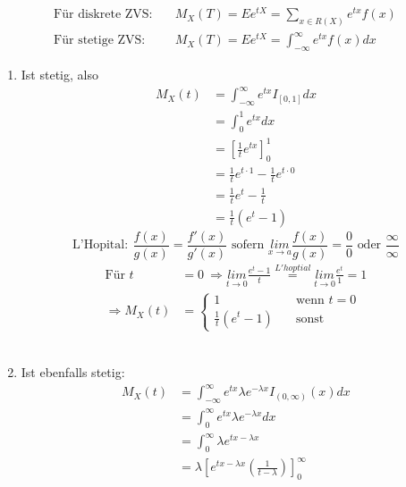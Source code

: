 \documentclass{article}
\begin{document}
\begin{align*}
    \text{Für diskrete ZVS:} \quad & M_X(T) = Ee^{tX} = \sum_{x \in R(X) }e^{tx}f(x) \\
    \text{Für stetige ZVS:} \quad & M_X(T) = Ee^{tX} = \int_{-\infty}^{\infty}e^{tx} f(x) dx
\end{align*}
\begin{enumerate}[label= zu \roman*)]
    \item   Ist stetig, also\begin{align*}
                M_X(t) &=  \int_{-\infty}^{\infty} e^{tx}I_{[0,1]} dx\\
                &= \int_{0}^{1} e^{tx} dx \\
                &= \left[\frac{1}{t} e^{tx}\right]_0^1 \\
                &= \frac{1}{t} e^{t\cdot 1} - \frac{1}{t} e^{t\cdot 0} \\  
                &= \frac{1}{t} e^t - \frac{1}{t} \\
                &= \frac{1}{t}(e^t -1)
            \end{align*} 
            \[\text{L'Hopital}: ~ \frac{f(x)}{g(x)} = \frac{f'(x)}{g'(x)} \text{ sofern } \underset{x \rightarrow a}{lim} \frac{f(x)}{g(x)} = \frac{0}{0} \text{ oder } \frac{\infty}{\infty}\]
            \begin{align*} 
                \text{Für } t &= 0 ~\Rightarrow  \underset{t \rightarrow 0}{lim} \frac{e^t - 1}{t} \overset{L'hoptial}{=} \underset{t \rightarrow 0}{lim} \frac{e^t}{1} = 1 \\
                \Longrightarrow M_X(t) &= \begin{cases}
                    1 &\text{wenn } t = 0\\
                    \frac{1}{t}(e^t-1) \quad & \text{sonst} 
                \end{cases}
            \end{align*} \\
    \item Ist ebenfalls stetig: \begin{align*}
                M_X(t) &=  \int_{-\infty}^{\infty} e^{tx}\lambda e^{-\lambda x} I_{(0, \infty)}(x) dx\\
                &= \int_{0}^{\infty} e^{tx} \lambda e^{-\lambda x} dx \\
                &= \int_{0}^{\infty} \lambda e^{tx  - \lambda x} \\
                &= \lambda \left[e^{tx  - \lambda x} (\frac{1}{t - \lambda})\right]_0^{\infty} \\

\end{align*}
\end{enumerate}
\end{document}
